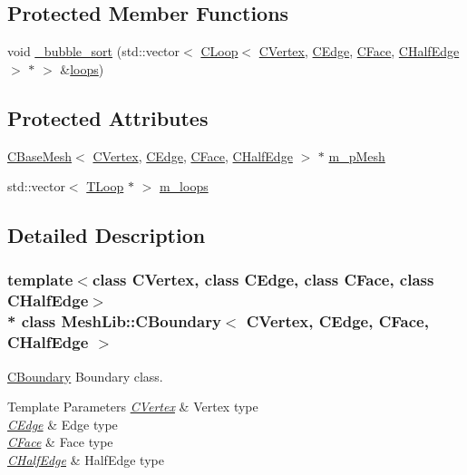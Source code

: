 \subsection*{Protected Member Functions}
\begin{DoxyCompactItemize}
\item 
void \hyperlink{class_mesh_lib_1_1_c_boundary_a323f8a0aa90198d55814cac0e3477228}{\+\_\+bubble\+\_\+sort} (std\+::vector$<$ \hyperlink{class_mesh_lib_1_1_c_loop}{C\+Loop}$<$ \hyperlink{class_mesh_lib_1_1_c_vertex}{C\+Vertex}, \hyperlink{class_mesh_lib_1_1_c_edge}{C\+Edge}, \hyperlink{class_mesh_lib_1_1_c_face}{C\+Face}, \hyperlink{class_mesh_lib_1_1_c_half_edge}{C\+Half\+Edge} $>$ $\ast$ $>$ \&\hyperlink{class_mesh_lib_1_1_c_boundary_aa71cb8a6d3f8107da8dad93523da97db}{loops})
\end{DoxyCompactItemize}
\subsection*{Protected Attributes}
\begin{DoxyCompactItemize}
\item 
\hyperlink{class_mesh_lib_1_1_c_base_mesh}{C\+Base\+Mesh}$<$ \hyperlink{class_mesh_lib_1_1_c_vertex}{C\+Vertex}, \hyperlink{class_mesh_lib_1_1_c_edge}{C\+Edge}, \hyperlink{class_mesh_lib_1_1_c_face}{C\+Face}, \hyperlink{class_mesh_lib_1_1_c_half_edge}{C\+Half\+Edge} $>$ $\ast$ \hyperlink{class_mesh_lib_1_1_c_boundary_aa8433a77082ef2564f6dde8abac6cccf}{m\+\_\+p\+Mesh}
\item 
std\+::vector$<$ \hyperlink{class_mesh_lib_1_1_c_loop}{T\+Loop} $\ast$ $>$ \hyperlink{class_mesh_lib_1_1_c_boundary_aace53fe51b6ce09ba0d0f59a92ef413b}{m\+\_\+loops}
\end{DoxyCompactItemize}


\subsection{Detailed Description}
\subsubsection*{template$<$class C\+Vertex, class C\+Edge, class C\+Face, class C\+Half\+Edge$>$\\*
class Mesh\+Lib\+::\+C\+Boundary$<$ C\+Vertex, C\+Edge, C\+Face, C\+Half\+Edge $>$}

\hyperlink{class_mesh_lib_1_1_c_boundary}{C\+Boundary} Boundary class. 


\begin{DoxyTemplParams}{Template Parameters}
{\em \hyperlink{class_mesh_lib_1_1_c_vertex}{C\+Vertex}} & Vertex type \\
\hline
{\em \hyperlink{class_mesh_lib_1_1_c_edge}{C\+Edge}} & Edge type \\
\hline
{\em \hyperlink{class_mesh_lib_1_1_c_face}{C\+Face}} & Face type \\
\hline
{\em \hyperlink{class_mesh_lib_1_1_c_half_edge}{C\+Half\+Edge}} & Half\+Edge type \\
\hline
\end{DoxyTemplParams}



